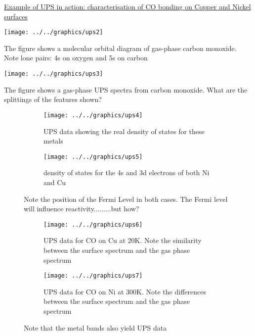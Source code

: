 \documentclass[ignorenonframetext]{beamer}
\begin{document}
\underline{Example of UPS in action: characterisation of CO bonding on Copper and Nickel surfaces}

\begin{center}\texttt{[image: ../../graphics/ups2]}\end{center}

The figure shows a molecular orbital diagram of gas-phase carbon monoxide. 
Note lone pairs: 4s on oxygen and 5s on carbon

\begin{center}\texttt{[image: ../../graphics/ups3]}\end{center}

The figure shows a gas-phase UPS spectra from carbon monoxide.
What are the splittings of the features shown?

\begin{figure}[H]
\centering
\begin{subfigure}[b]{.45\textwidth}
\texttt{[image: ../../graphics/ups4]}
\caption{UPS data showing the real density of states for these metals}
\end{subfigure}
\begin{subfigure}[b]{.45\textwidth}
\texttt{[image: ../../graphics/ups5]}
\caption{density of states for the 4s and 3d electrons of both Ni and Cu}
\end{subfigure}
\caption{Note the position of the Fermi Level in both cases. The Fermi level will influence reactivity.........but how?}
\end{figure}

\begin{figure}[H]
\centering
\begin{subfigure}[b]{.45\textwidth}
\texttt{[image: ../../graphics/ups6]}
\caption{UPS data for CO on Cu at 20K. Note the similarity between the surface  spectrum and the gas phase spectrum}
\end{subfigure}
\begin{subfigure}[b]{.45\textwidth}
\texttt{[image: ../../graphics/ups7]}
\caption{UPS data for CO on Ni at 300K. Note the differences  between the surface  spectrum and the gas phase spectrum}
\end{subfigure}
\caption{Note that the metal bands also yield UPS data}
\end{figure}


\begin{frame}
\end{frame}
\end{document}
